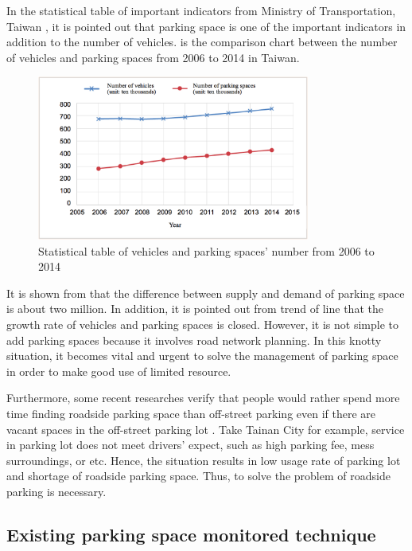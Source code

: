 \documentclass[runningheads,a4paper]{llncs}
\begin{document}
In the statistical table of important indicators from Ministry of
Transportation, Taiwan \cite{motc}, it is pointed out that parking space is one
of the important indicators in addition to the number of vehicles.
 is the comparison chart between the number of vehicles and
parking spaces from 2006 to 2014 in Taiwan.

\begin{figure}[tbp]
\begin{center}
\includegraphics[width=0.8\textwidth]{Figures/Statistical_Table.png}
\end{center}
\caption{Statistical table of vehicles and parking spaces' number from
2006 to 2014}
\label{fig:StatisticalTable}
\end{figure}

It is shown from  that the difference between supply and demand
of parking space is about two million. In addition, it is pointed out
from trend of line that the growth rate of vehicles and parking spaces
is closed. However, it is not simple to add parking spaces because it
involves road network planning. In this knotty situation, it becomes
vital and urgent to solve the management of parking space in order to
make good use of limited resource.

Furthermore, some recent researches verify that people would rather
spend more time finding roadside parking space than off-street parking
even if there are vacant spaces in the off-street parking lot \cite{OnStreetParking}. Take
Tainan City for example, service in parking lot does not meet drivers'
expect, such as high parking fee, mess surroundings, or etc. Hence, the
situation results in low usage rate of parking lot and shortage of
roadside parking space. Thus, to solve the problem of roadside parking
is necessary.

%
\subsection{Existing parking space monitored technique}
%
\end{document}
